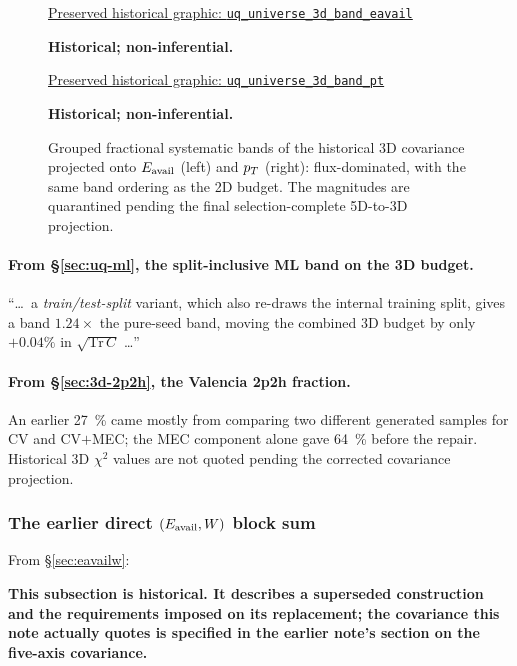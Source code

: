 \begin{figure}[H]
  \centering
  \par\href{https://github.com/josephbaileyy/MINERvA-OmniFold/blob/3892e769043cddebfd58ec19e1ab1a567eb01784/docs/analysis-note/figures/uq_universe_3d_band_eavail.pdf}{Preserved historical graphic: \texttt{uq\_universe\_3d\_band\_eavail}} \par\smallskip\textbf{Historical; non-inferential.} \par\href{https://github.com/josephbaileyy/MINERvA-OmniFold/blob/3892e769043cddebfd58ec19e1ab1a567eb01784/docs/analysis-note/figures/uq_universe_3d_band_pt.pdf}{Preserved historical graphic: \texttt{uq\_universe\_3d\_band\_pt}} \par\smallskip\textbf{Historical; non-inferential.}
  \caption{Grouped fractional systematic bands of the historical 3D covariance projected onto $E_{\mathrm{avail}}$ (left) and $p_{T}$ (right): flux-dominated, with the same band ordering as the 2D budget. The magnitudes are quarantined pending the final selection-complete 5D-to-3D projection.}
  \label{fig:3dbands}
\end{figure}

\paragraph{From \S\ref{sec:uq-ml}, the split-inclusive ML band on the 3D budget.} ``\ldots\ a \emph{train/test-split} variant, which also re-draws the internal training split, gives a band $1.24\times$ the pure-seed band, moving the combined 3D budget by only $+0.04\%$ in $\sqrt{\mathrm{Tr}\,C}$ \ldots''

\paragraph{From \S\ref{sec:3d-2p2h}, the Valencia 2p2h fraction.} An earlier \SI{27}{\percent} came mostly from comparing two different generated samples for CV and CV$+$MEC; the MEC component alone gave \SI{64}{\percent} before the repair. Historical 3D $\chi^{2}$ values are not quoted pending the corrected covariance projection.

\subsubsection{The earlier direct $(E_{\mathrm{avail}},W)$ block sum}
\label{sec:eavailw-cov}
From \S\ref{sec:eavailw}:

\noindent\textbf{This subsection is historical. It describes a superseded construction and the requirements imposed on its replacement; the covariance this note actually quotes is specified in the earlier note's section on the five-axis covariance.}


